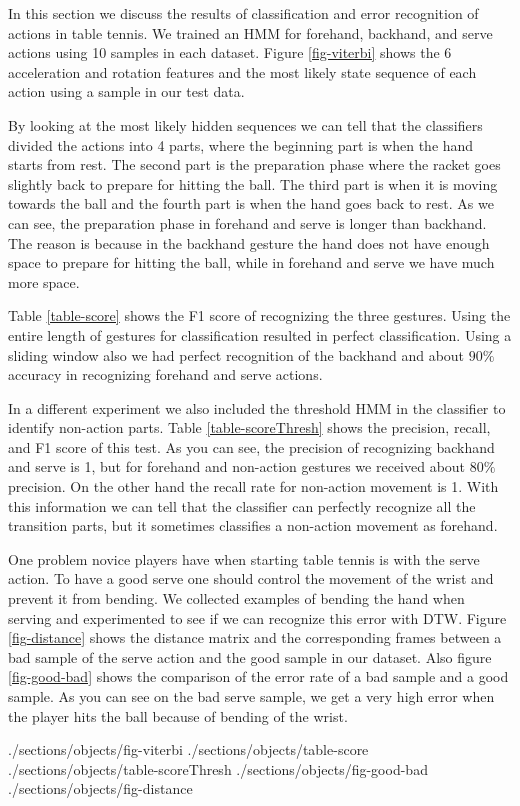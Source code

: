 In this section we discuss the results of classification and error recognition of actions in table tennis. We trained an HMM for forehand, backhand, and serve actions using 10 samples in each dataset. Figure \ref{fig-viterbi} shows the 6 acceleration and rotation features and the most likely state sequence of each action using a sample in our test data.

By looking at the most likely hidden sequences we can tell that the classifiers divided the actions into 4 parts, where the beginning part is when the hand starts from rest. The second part is the preparation phase where the racket goes slightly back to prepare for hitting the ball. The third part is when it is moving towards the ball and the fourth part is when the hand goes back to rest. As we can see, the preparation phase in forehand and serve is longer than backhand. The reason is because in the backhand gesture the hand does not have enough space to prepare for hitting the ball, while in forehand and serve we have much more space.

Table \ref{table-score} shows the F1 score of recognizing the three gestures. Using the entire length of gestures for classification resulted in perfect classification. Using a sliding window also we had perfect recognition of the backhand and about $90\%$ accuracy in recognizing forehand and serve actions.

In a different experiment we also included the threshold HMM in the classifier to identify non-action parts. Table \ref{table-scoreThresh} shows the precision, recall, and F1 score of this test. As you can see, the precision of recognizing backhand and serve is 1, but for forehand and non-action gestures we received about $80\%$ precision. On the other hand the recall rate for non-action movement is 1. With this information we can tell that the classifier can perfectly recognize all the transition parts, but it sometimes classifies a non-action movement as forehand. 

One problem novice players have when starting table tennis is with the serve action. To have a good serve one should control the movement of the wrist and prevent it from bending. We collected examples of bending the hand when serving and experimented to see if we can recognize this error with DTW. Figure \ref{fig-distance} shows the distance matrix and the corresponding frames between a bad sample of the serve action and the good sample in our dataset. Also figure \ref{fig-good-bad} shows the comparison of the error rate of a bad sample and a good sample. As you can see on the bad serve sample, we get a very high error when the player hits the ball because of bending of the wrist. 

 {./sections/objects/fig-viterbi}
 {./sections/objects/table-score}
 {./sections/objects/table-scoreThresh}
 {./sections/objects/fig-good-bad}
 {./sections/objects/fig-distance}
